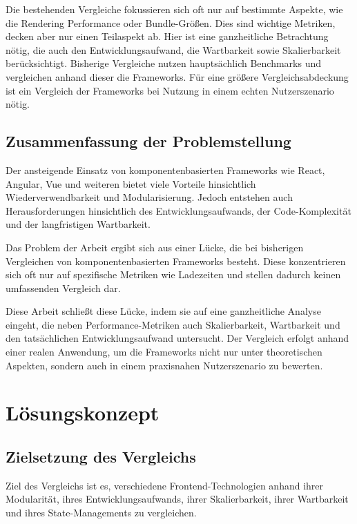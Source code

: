\documentclass[oneside]{ausarbeitung}
\begin{document}
Die bestehenden Vergleiche fokussieren sich oft nur auf bestimmte Aspekte, wie die Rendering Performance oder Bundle-Größen. Dies sind wichtige Metriken, decken aber nur einen Teilaspekt ab. Hier ist eine ganzheitliche Betrachtung nötig, die auch den Entwicklungsaufwand, die Wartbarkeit sowie Skalierbarkeit berücksichtigt. Bisherige Vergleiche nutzen hauptsächlich Benchmarks und vergleichen anhand dieser die Frameworks. Für eine größere Vergleichsabdeckung ist ein Vergleich der Frameworks bei Nutzung in einem echten Nutzerszenario nötig. 

\section{Zusammenfassung der Problemstellung}
Der ansteigende Einsatz von komponentenbasierten Frameworks wie React, Angular, Vue und weiteren bietet viele Vorteile hinsichtlich Wiederverwendbarkeit und Modularisierung. Jedoch entstehen auch Herausforderungen hinsichtlich des Entwicklungsaufwands, der Code-Komplexität und der langfristigen Wartbarkeit.

Das Problem der Arbeit ergibt sich aus einer Lücke, die bei bisherigen Vergleichen von komponentenbasierten Frameworks besteht. Diese konzentrieren sich oft nur auf spezifische Metriken wie Ladezeiten und stellen dadurch keinen umfassenden Vergleich dar.

Diese Arbeit schließt diese Lücke, indem sie auf eine ganzheitliche Analyse eingeht, die neben Performance-Metriken auch Skalierbarkeit, Wartbarkeit und den tatsächlichen Entwicklungsaufwand untersucht. Der Vergleich erfolgt anhand einer realen Anwendung, um die Frameworks nicht nur unter theoretischen Aspekten, sondern auch in einem praxisnahen Nutzerszenario zu bewerten.

\chapter{Lösungskonzept}
\label{cha:loesungskonzept}

\section{Zielsetzung des Vergleichs}
Ziel des Vergleichs ist es, verschiedene Frontend-Technologien anhand ihrer Modularität, ihres Entwicklungsaufwands, ihrer Skalierbarkeit, ihrer Wartbarkeit und ihres State-Managements zu vergleichen.
\end{document}

